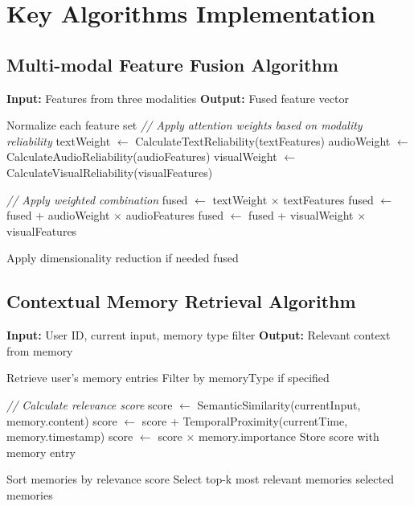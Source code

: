 \section{Key Algorithms Implementation}

\subsection{Multi-modal Feature Fusion Algorithm}
\begin{algorithm}[H]
\caption{Multi-modal Feature Fusion}
\label{alg:feature_fusion}
\begin{algorithmic}[1]
    \State \textbf{Input:} Features from three modalities
    \State \textbf{Output:} Fused feature vector
    
    \State Normalize each feature set
    \State \textit{// Apply attention weights based on modality reliability}
    \State textWeight $\gets$ CalculateTextReliability(textFeatures)
    \State audioWeight $\gets$ CalculateAudioReliability(audioFeatures)
    \State visualWeight $\gets$ CalculateVisualReliability(visualFeatures)
    
    \State \textit{// Apply weighted combination}
    \State fused $\gets$ textWeight $\times$ textFeatures
    \State fused $\gets$ fused + audioWeight $\times$ audioFeatures
    \State fused $\gets$ fused + visualWeight $\times$ visualFeatures
    
    \State Apply dimensionality reduction if needed
    \State \Return fused
\EndProcedure
\end{algorithmic}
\end{algorithm}

\subsection{Contextual Memory Retrieval Algorithm}
\begin{algorithm}[H]
\caption{Contextual Memory Retrieval}
\label{alg:memory_retrieval}
\begin{algorithmic}[1]
    \State \textbf{Input:} User ID, current input, memory type filter
    \State \textbf{Output:} Relevant context from memory
    
    \State Retrieve user's memory entries
    \State Filter by memoryType if specified
    
        \State \textit{// Calculate relevance score}
        \State score $\gets$ SemanticSimilarity(currentInput, memory.content)
        \State score $\gets$ score + TemporalProximity(currentTime, memory.timestamp)
        \State score $\gets$ score $\times$ memory.importance
        \State Store score with memory entry
    \EndFor
    
    \State Sort memories by relevance score
    \State Select top-k most relevant memories
    \State \Return selected memories
\EndProcedure
\end{algorithmic}
\end{algorithm}
